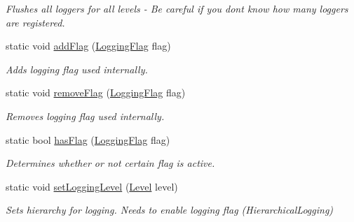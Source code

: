 \begin{DoxyCompactItemize}
\begin{DoxyCompactList}\small\item\em Flushes all loggers for all levels -\/ Be careful if you dont know how many loggers are registered. \end{DoxyCompactList}\item 
\hypertarget{classel_1_1Loggers_aedd2de02dd701b0f20ddaa10f1f728f1}{static void \hyperlink{classel_1_1Loggers_aedd2de02dd701b0f20ddaa10f1f728f1}{add\-Flag} (\hyperlink{namespaceel_a2784aacd04cb7816ac1c0b20fcbf83cb}{Logging\-Flag} flag)}\label{classel_1_1Loggers_aedd2de02dd701b0f20ddaa10f1f728f1}

\begin{DoxyCompactList}\small\item\em Adds logging flag used internally. \end{DoxyCompactList}\item 
\hypertarget{classel_1_1Loggers_a23fcb4b492f70a34285c45c0b5e2e515}{static void \hyperlink{classel_1_1Loggers_a23fcb4b492f70a34285c45c0b5e2e515}{remove\-Flag} (\hyperlink{namespaceel_a2784aacd04cb7816ac1c0b20fcbf83cb}{Logging\-Flag} flag)}\label{classel_1_1Loggers_a23fcb4b492f70a34285c45c0b5e2e515}

\begin{DoxyCompactList}\small\item\em Removes logging flag used internally. \end{DoxyCompactList}\item 
\hypertarget{classel_1_1Loggers_a591a45565c1eb7073ec3a979df8b5a4c}{static bool \hyperlink{classel_1_1Loggers_a591a45565c1eb7073ec3a979df8b5a4c}{has\-Flag} (\hyperlink{namespaceel_a2784aacd04cb7816ac1c0b20fcbf83cb}{Logging\-Flag} flag)}\label{classel_1_1Loggers_a591a45565c1eb7073ec3a979df8b5a4c}

\begin{DoxyCompactList}\small\item\em Determines whether or not certain flag is active. \end{DoxyCompactList}\item 
\hypertarget{classel_1_1Loggers_afbee019d722fef5148d8355f45ba7993}{static void \hyperlink{classel_1_1Loggers_afbee019d722fef5148d8355f45ba7993}{set\-Logging\-Level} (\hyperlink{namespaceel_ab0ac6091262344c52dd2d3ad099e8e36}{Level} level)}\label{classel_1_1Loggers_afbee019d722fef5148d8355f45ba7993}

\begin{DoxyCompactList}\small\item\em Sets hierarchy for logging. Needs to enable logging flag (Hierarchical\-Logging) \end{DoxyCompactList}\end{DoxyCompactItemize}


